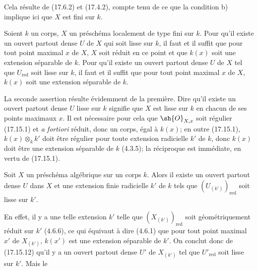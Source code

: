 Cela résulte de (17.6.2) et (17.4.2), compte tenu de ce que la condition b) implique ici que $X$ est fini sur $k$.

\begin{proposition}[17.15.12]
\label{IV.17.15.12}
Soient $k$ un corps, $X$ un préschéma localement de type fini sur $k$. Pour qu'il existe un ouvert partout dense $U$ de $X$ qui soit lisse sur $k$, il faut et il suffit que pour tout point maximal $x$ de $X$, $X$ soit réduit en ce point et que $k(x)$ soit une extension séparable de $k$. Pour qu'il existe un ouvert partout dense $U$ de $X$ tel que $U_{\mathrm{red}}$ soit lisse sur $k$, il faut et il suffit que pour tout point maximal $x$ de $X$, $k(x)$ soit une extension séparable de $k$.
\end{proposition}

La seconde assertion résulte évidemment de la première. Dire qu'il existe un ouvert partout dense $U$ lisse sur $k$ signifie que $X$ est lisse sur $k$ en chacun de ses points maximaux $x$. Il est nécessaire pour cela que $\sh{O}_{X,x}$ soit régulier (17.15.1) et \emph{a fortiori} réduit, donc un corps, égal à $k(x)$; en outre (17.15.1), $k(x)\otimes_k k'$ doit être régulier pour toute extension radicielle $k'$ de $k$, donc $k(x)$ doit être une extension séparable de $k$ (4.3.5); la réciproque est immédiate, en vertu de (17.15.1).

\begin{corollary}[17.15.13]
\label{IV.17.15.13}
Soit $X$ un préschéma algébrique sur un corps $k$. Alors il existe un ouvert partout dense $U$ dans $X$ et une extension finie radicielle $k'$ de $k$ tels que $(U_{(k')})_{\mathrm{red}}$ soit lisse sur $k'$.
\end{corollary}

En effet, il y a une telle extension $k'$ telle que $(X_{(k')})_{\mathrm{red}}$ soit géométriquement réduit sur $k'$ (4.6.6), ce qui équivaut à dire (4.6.1) que pour tout point maximal $x'$ de $X_{(k')}$, $k(x')$ est une extension séparable de $k'$. On conclut donc de (17.15.12) qu'il y a un ouvert partout dense $U'$ de $X_{(k')}$ tel que $U'_{\mathrm{red}}$ soit lisse sur $k'$. Mais le 